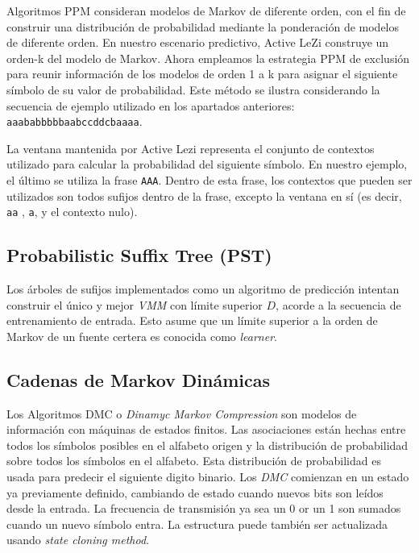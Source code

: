 Algoritmos PPM consideran modelos de Markov de diferente orden,  con el fin de construir una distribución de probabilidad mediante la ponderación de modelos de diferente orden. En nuestro escenario predictivo, Active LeZi construye un orden-k del modelo de Markov. Ahora empleamos la estrategia PPM de exclusión para reunir información de los modelos de orden 1 a k para asignar el siguiente símbolo de su valor de probabilidad. Este método se ilustra considerando la secuencia de ejemplo utilizado en los apartados anteriores: \texttt{aaababbbbbaabccddcbaaaa}.

La ventana mantenida por Active Lezi representa el conjunto de contextos utilizado para calcular la probabilidad  del siguiente símbolo. En nuestro ejemplo, el último se utiliza la frase \texttt{AAA}. Dentro de esta frase, los contextos que pueden ser utilizados son todos sufijos dentro de la frase, excepto la ventana en sí (es decir, \texttt{aa} , \texttt{a}, y el contexto nulo).

	


 \subsection{Probabilistic Suffix Tree (PST)}
 
 Los árboles de sufijos implementados como un algoritmo de predicción intentan construir el único y mejor \emph{VMM} con límite superior $D$, acorde a la secuencia de entrenamiento de entrada. Esto asume que un límite superior a la orden de Markov de un fuente certera es conocida como \emph{learner}.
 
 
 
 \subsection{Cadenas de Markov Dinámicas}
 
 
 Los Algoritmos DMC o \emph{Dinamyc Markov Compression} son modelos de información con máquinas de estados finitos. Las asociaciones están hechas entre todos los símbolos posibles en el alfabeto origen y la distribución de probabilidad sobre todos los símbolos en el alfabeto. 
 Esta distribución de probabilidad es usada para predecir el siguiente digito binario. 
 Los \emph{DMC} comienzan en un estado ya previamente definido, cambiando de estado cuando nuevos bits son leídos desde la entrada. La frecuencia de transmisión ya sea un 0 or un 1 son sumados cuando un nuevo símbolo entra. La estructura puede también ser actualizada usando \emph{state cloning method}.
 
